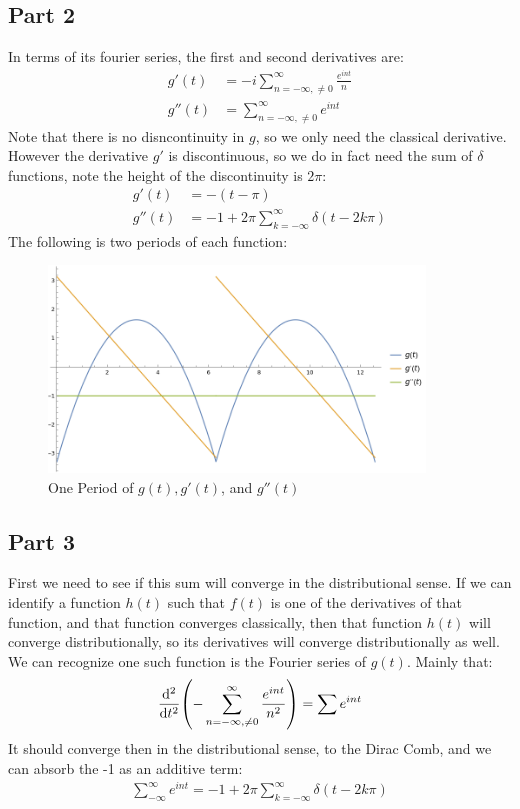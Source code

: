 \documentclass[12pt]{article}
\begin{document}
\subsection*{Part 2}
In terms of its fourier series, the first and second derivatives are:
\begin{equation}
  \boxed{
    \begin{aligned}
      g'(t)&=-i\sum_{n=-\infty,\neq0}^\infty\frac{e^{int}}{n}\\
      g''(t)&=\sum_{n=-\infty,\neq0}^\infty e^{int}
    \end{aligned}
  }
\end{equation}
Note that there is no disncontinuity in $g$, so we only need the classical derivative. However the derivative $g'$ is discontinuous, so we do in fact need the sum of $\delta$ functions, note the height of the discontinuity is $2\pi$:
\begin{equation}
  \boxed{
    \begin{aligned}
      g'(t)&=-(t-\pi)\\
      g''(t)&=-1+2\pi\sum_{k=-\infty}^\infty\delta(t-2k\pi)
    \end{aligned}
  }
\end{equation}
The following is two periods of each function:
\begin{figure}[H]
  \centering
  \includegraphics[width=10cm]{fourierplot.png}
  \caption{One Period of $g(t), g'(t)$, and $g''(t)$}
  \label{fig:1}
\end{figure}
\subsection*{Part 3}
First we need to see if this sum will converge in the distributional sense. If we can identify a function $h(t)$ such that $f(t)$ is one of the derivatives of that function, and that function converges classically, then that function $h(t)$ will converge distributionally, so its derivatives will converge distributionally as well. We can recognize one such function is the Fourier series of $g(t)$. Mainly that:
\begin{align*}
  \dv[2]{t}\qty(-\sum_{n=-\infty,\neq0}^\infty\frac{e^{int}}{n^2})=\sum e^{int}
\end{align*}
It should converge then in the distributional sense, to the Dirac Comb, and we can absorb the -1 as an additive term:
\begin{align}
  \boxed{
    \sum_{-\infty}^\infty e^{int}=-1+2\pi\sum_{k=-\infty}^{\infty}\delta(t-2k\pi)
  }
\end{align}
\end{document}
